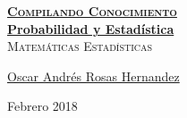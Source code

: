 \documentclass[12pt, fleqn]{report}                             %
\author{Oscar Andrés Rosas}                                     %
\theoremstyle{break}                                            %
\begin{document}
\begin{titlepage}
    
    \pagecolor{TitlePageColor}                                      %
    \color{white}                                                   %

    \vspace                                                         %
    \baselineskip                                                   %

    \makebox[0pt][l]{\rule{1.3\textwidth}{3pt}}                     %
    
    \href{https://compilandoconocimiento.com}                       %
    {\textbf{\textsc{\Huge Compilando Conocimiento}}}\\[2.7cm]      %

    \href{\ProjectNameLink/LibroProbabilidad}                       %
    {\fontsize{36}{50}                                              %
        \selectfont \textbf{Probabilidad y Estadística}}\\[0.5cm]   %
    \textcolor{ColorSubtext}                                        %
        {\textsc{\LARGE Matemáticas Estadísticas}}                  %
    
    \vfill                                                          %
    
    \href{https://compilandoconocimiento.com/yo}                    %
    {\LARGE \textsf{Oscar Andrés Rosas Hernandez}}                  %

    \vspace                                                         %
    \baselineskip                                                   %
    
    {\large \textsf{Febrero 2018}}                                  %

\end{titlepage}
\end{document}
